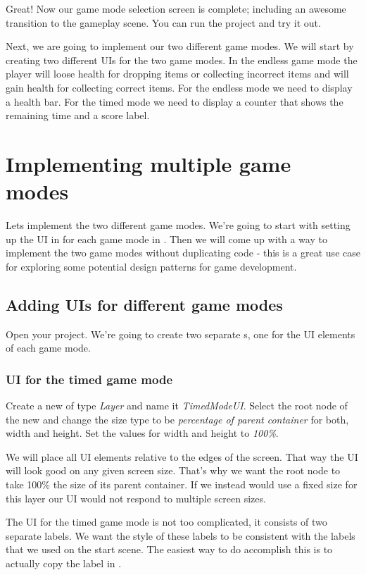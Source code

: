 Great! Now our game mode selection screen is complete; including an awesome
transition to the gameplay scene. You can run the project and try it out.

Next, we are going to implement our two different game modes. We will start by
creating two different UIs for the two game modes. In the endless game mode the
player will loose health for dropping items or collecting incorrect items and
will gain health for collecting correct items. For the endless mode we need to
display a health bar. For the timed mode we need to display a counter that shows
the remaining time and a score label.

\section{Implementing multiple game modes}
Lets implement the two different game modes. We're
going to start with setting up the UI in for each game mode in \SB{}. Then we
will come up with a way to implement the two game modes without duplicating
code - this is a great use case for exploring some potential design patterns for
game development.

\subsection{Adding UIs for different game modes}
Open your \SB{} project. We're going to create two separate \ccbfile{}s, one for
the UI elements of each game mode.

\subsubsection{UI for the timed game mode}
\begin{leftbar}
Create a new \ccbfile{} of type \textit{Layer} and name it \textit{TimedModeUI}.
Select the root node of the new \ccbfile{} and change the size type to be
\textit{percentage of parent container} for both, width and height. Set the
values for width and height to \textit{100\%}.
\end{leftbar}
We will place all UI elements relative to the edges of the screen. That way the
UI will look good on any given screen size. That's why we want the root node to
take 100\% the size of its parent container. If we instead would use a fixed
size for this layer our UI would not respond to multiple screen sizes.

The UI for the timed game mode is not too complicated, it consists of two
separate labels. We want the style of these labels to be consistent with the
labels that we used on the start scene. The easiest way to do accomplish this is
to actually copy the label in \SB{}.

